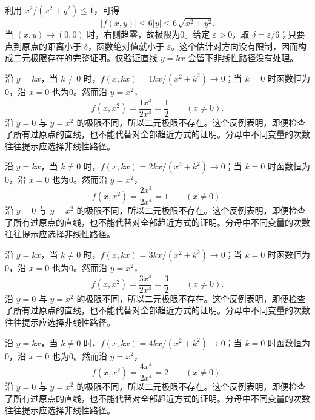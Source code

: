 \documentclass[12pt,fontset=fandol]{ctexart}
\begin{document}
\begin{solve}\label{ans:c32q7}
利用 $x^2/(x^2+y^2)\le1$，可得
\[
|f(x,y)|\le 6|y|\le 6\sqrt{x^2+y^2}.
\]
当 $(x,y)\to(0,0)$ 时，右侧趋零，故极限为0。给定 $\varepsilon>0$，取 $\delta=\varepsilon/6$；只要点到原点的距离小于 $\delta$，函数绝对值就小于 $\varepsilon$。这个估计对方向没有限制，因而构成二元极限存在的完整证明。仅验证直线 $y=kx$ 会留下非线性路径没有处理。
\end{solve}

\begin{solve}\label{ans:c32q8}
沿 $y=kx$，当 $k\ne0$ 时，$f(x,kx)=1kx/(x^2+k^2)\to0$；当 $k=0$ 时函数恒为0，沿 $x=0$ 也为0。然而沿 $y=x^2$，
\[
f(x,x^2)=\frac{1x^4}{2x^4}=\frac{1}{2}\qquad(x\ne0).
\]
沿 $y=0$ 与 $y=x^2$ 的极限不同，所以二元极限不存在。这个反例表明，即便检查了所有过原点的直线，也不能代替对全部趋近方式的证明。分母中不同变量的次数往往提示应选择非线性路径。
\end{solve}

\begin{solve}\label{ans:c32q9}
沿 $y=kx$，当 $k\ne0$ 时，$f(x,kx)=2kx/(x^2+k^2)\to0$；当 $k=0$ 时函数恒为0，沿 $x=0$ 也为0。然而沿 $y=x^2$，
\[
f(x,x^2)=\frac{2x^4}{2x^4}=1\qquad(x\ne0).
\]
沿 $y=0$ 与 $y=x^2$ 的极限不同，所以二元极限不存在。这个反例表明，即便检查了所有过原点的直线，也不能代替对全部趋近方式的证明。分母中不同变量的次数往往提示应选择非线性路径。
\end{solve}

\begin{solve}\label{ans:c32q10}
沿 $y=kx$，当 $k\ne0$ 时，$f(x,kx)=3kx/(x^2+k^2)\to0$；当 $k=0$ 时函数恒为0，沿 $x=0$ 也为0。然而沿 $y=x^2$，
\[
f(x,x^2)=\frac{3x^4}{2x^4}=\frac{3}{2}\qquad(x\ne0).
\]
沿 $y=0$ 与 $y=x^2$ 的极限不同，所以二元极限不存在。这个反例表明，即便检查了所有过原点的直线，也不能代替对全部趋近方式的证明。分母中不同变量的次数往往提示应选择非线性路径。
\end{solve}

\begin{solve}\label{ans:c32q11}
沿 $y=kx$，当 $k\ne0$ 时，$f(x,kx)=4kx/(x^2+k^2)\to0$；当 $k=0$ 时函数恒为0，沿 $x=0$ 也为0。然而沿 $y=x^2$，
\[
f(x,x^2)=\frac{4x^4}{2x^4}=2\qquad(x\ne0).
\]
沿 $y=0$ 与 $y=x^2$ 的极限不同，所以二元极限不存在。这个反例表明，即便检查了所有过原点的直线，也不能代替对全部趋近方式的证明。分母中不同变量的次数往往提示应选择非线性路径。
\end{solve}
\end{document}
